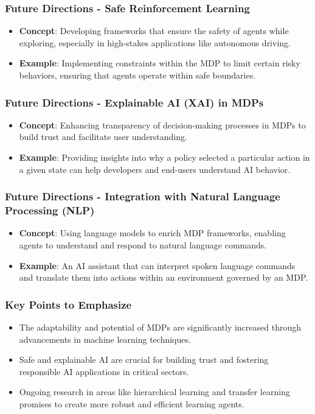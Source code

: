 \documentclass[aspectratio=169]{beamer}
\begin{document}
\begin{frame}[fragile]
    \frametitle{Future Directions - Safe Reinforcement Learning}
    \begin{itemize}
        \item \textbf{Concept}: Developing frameworks that ensure the safety of agents while exploring, especially in high-stakes applications like autonomous driving.
        \item \textbf{Example}: Implementing constraints within the MDP to limit certain risky behaviors, ensuring that agents operate within safe boundaries.
    \end{itemize}
\end{frame}

\begin{frame}[fragile]
    \frametitle{Future Directions - Explainable AI (XAI) in MDPs}
    \begin{itemize}
        \item \textbf{Concept}: Enhancing transparency of decision-making processes in MDPs to build trust and facilitate user understanding.
        \item \textbf{Example}: Providing insights into why a policy selected a particular action in a given state can help developers and end-users understand AI behavior.
    \end{itemize}
\end{frame}

\begin{frame}[fragile]
    \frametitle{Future Directions - Integration with Natural Language Processing (NLP)}
    \begin{itemize}
        \item \textbf{Concept}: Using language models to enrich MDP frameworks, enabling agents to understand and respond to natural language commands.
        \item \textbf{Example}: An AI assistant that can interpret spoken language commands and translate them into actions within an environment governed by an MDP.
    \end{itemize}
\end{frame}

\begin{frame}[fragile]
    \frametitle{Key Points to Emphasize}
    \begin{itemize}
        \item The adaptability and potential of MDPs are significantly increased through advancements in machine learning techniques.
        \item Safe and explainable AI are crucial for building trust and fostering responsible AI applications in critical sectors.
        \item Ongoing research in areas like hierarchical learning and transfer learning promises to create more robust and efficient learning agents.
    \end{itemize}
\end{frame}
\end{document}
